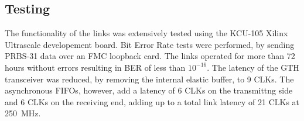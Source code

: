 \documentclass[a4paper]{PoS}
\begin{document}
\subsection{Testing}
The functionality of the links was extensively tested using the KCU-105 Xilinx Ultrascale developement board. Bit Error Rate tests were performed, by sending PRBS-31 data over an FMC loopback card. The links operated for more than 72 hours without errors resulting in BER of less than $10^{-16}$. The latency of the GTH transceiver was reduced, by removing the internal elastic buffer, to 9 CLKs. The asynchronous FIFOs, however, add a latency of 6 CLKs on the transmittng side and 6 CLKs on the receiving end, adding up to a total link latency of 21 CLKs at 250~MHz.

 


\end{document}
